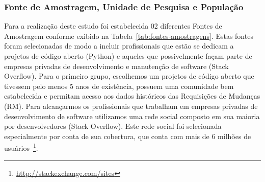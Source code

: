 \subsubsection{Fonte de Amostragem, Unidade de Pesquisa e População}
\label{subsubsec:fontes_amostragem}

Para a realização deste estudo foi estabelecida 02 diferentes Fontes de
Amostragem conforme exibido na Tabela~\ref{tab:fontes-amostragens}. Estas fontes
foram selecionadas de modo a incluir profissionais que estão se dedicam a
projetos de código aberto (Python) e aqueles que possivelmente façam parte de
empresas privadas de desenvolvimento e manutenção de software (Stack Overflow).
Para o primeiro grupo, escolhemos um projetos de código aberto que tivessem pelo
menos 5 anos de existência, possuem uma comunidade bem estabelecida e permitam
acesso aos dados históricos das Requisições de Mudanças (RM). Para alcançarmos
os profissionais que trabalham em empresas privadas de desenvolvimento de
software utilizamos uma rede social composto em sua maioria por desenvolvedores
(Stack Overflow). Este rede social foi  selecionada especialmente por conta de
sua cobertura, que conta com mais de 6 milhões de
usuários~\footnote{\url{http://stackexchange.com/sites}}.

\begin{table}[htb]
\centering
{}
\caption{Fontes de Amostragem utilizadas no estudo.}
\label{tb:fonte-de-amostragens}
\end{table}

